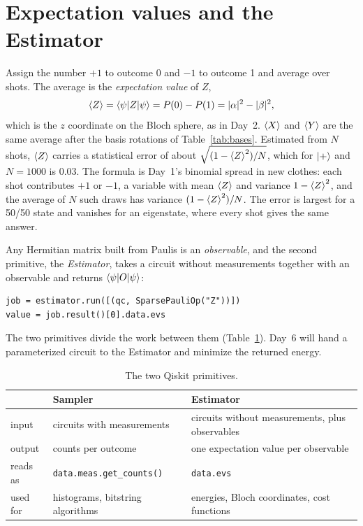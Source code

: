 \documentclass[11pt]{article}
\newcommand{\code}[1]{\texttt{#1}}
\begin{document}
\section{Expectation values and the Estimator}

Assign the number $+1$ to outcome 0 and $-1$ to outcome 1 and average over shots. The average is the \emph{expectation value} of $Z$,
\begin{equation}
\braket{Z} = \braket{\psi|Z|\psi} = P(0) - P(1) = |\alpha|^2 - |\beta|^2 ,
\label{eq:expz}
\end{equation}
which is the $z$ coordinate on the Bloch sphere, as in Day~2. $\braket{X}$ and $\braket{Y}$ are the same average after the basis rotations of Table~\ref{tab:bases}. Estimated from $N$ shots, $\braket{Z}$ carries a statistical error of about $\sqrt{(1 - \braket{Z}^2)/N}$, which for $\ket{+}$ and $N = 1000$ is $0.03$. The formula is Day~1's binomial spread in new clothes: each shot contributes $+1$ or $-1$, a variable with mean $\braket{Z}$ and variance $1 - \braket{Z}^2$, and the average of $N$ such draws has variance $(1 - \braket{Z}^2)/N$. The error is largest for a 50/50 state and vanishes for an eigenstate, where every shot gives the same answer.

Any Hermitian matrix built from Paulis is an \emph{observable}, and the second primitive, the \emph{Estimator}, takes a circuit without measurements together with an observable and returns $\braket{\psi|O|\psi}$:
\begin{lstlisting}
job = estimator.run([(qc, SparsePauliOp("Z"))])
value = job.result()[0].data.evs
\end{lstlisting}
The two primitives divide the work between them (Table~\ref{tab:primitives}). Day~6 will hand a parameterized circuit to the Estimator and minimize the returned energy.

\begin{table}[h]
\centering
\small
\begin{tabular}{@{}lll@{}}
\toprule
& Sampler & Estimator \\
\midrule
input & circuits with measurements & circuits without measurements, plus observables \\
output & counts per outcome & one expectation value per observable \\
reads as & \code{data.meas.get\_counts()} & \code{data.evs} \\
used for & histograms, bitstring algorithms & energies, Bloch coordinates, cost functions \\
\bottomrule
\end{tabular}
\caption{The two Qiskit primitives.}
\label{tab:primitives}
\end{table}
\end{document}
